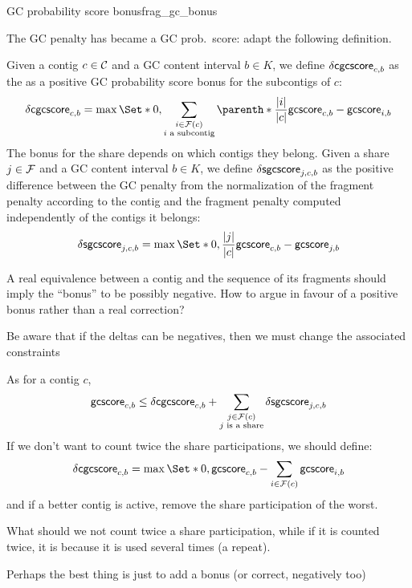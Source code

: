 \begin{definition}{GC probability score bonus}{frag_gc_bonus}
  \begin{fixmebox}
    The GC penalty has became a GC prob.\ score: adapt the following definition.
  \end{fixmebox}
  Given a contig \(c \in \mathcal{C}{}\) and a GC content interval \(b \in K\), we define \(\mathsf{\delta cgcscore}_{c, b}\) as the as a positive GC probability score bonus for the subcontigs of \(c\):
  \[
    \dcgcscore{c}{b} = \max \Set*{
      0,
      \sum_{\substack{
          i \in \Fragments{}(c) \\ i \text{ a subcontig}
      }}
      \parenth*{
        \frac{|i|}{|c|}\gcscore{c}{b} - \gcscore{i}{b}
      }
    }
  \]
  The bonus for the share depends on which contigs they belong.
  Given a share \(j \in \mathcal{F}{}\) and a GC content interval \(b \in K\), we define \(\mathsf{\delta sgcscore}_{j, c, b}\) as the positive difference between the GC penalty from the normalization of the fragment penalty according to the contig and the fragment penalty computed independently of the contigs it belongs:
  \[
    \dsgcscore{j}{c}{b} = \max \Set*{
      0,
      \frac{|j|}{|c|} \gcscore{c}{b} - \gcscore{j}{b}
    }
  \]
  \begin{questionbox}
    A real equivalence between a contig and the sequence of its fragments should imply the \enquote{bonus} to be possibly negative.
    How to argue in favour of a positive bonus rather than a real correction?

    Be aware that if the deltas can be negatives, then we must change the associated constraints
  \end{questionbox}
\end{definition}

\begin{ideabox}
  As for a contig \(c\),
  \[
    \mathsf{gcscore}_{c, b} \leq \mathsf{\delta cgcscore}_{c, b} + \sum_{\substack{
        j \in \mathcal{F}{}(c) \\
        j \text{ is a share}
    }}\mathsf{\delta sgcscore}_{j, c, b}
  \]
  If we don't want to count twice the share participations, we should define:
  \[
    \dcgcscore{c}{b} = \max \Set*{
      0,
      \gcscore{c}{b} - \sum_{i \in \Fragments{}(c)} \gcscore{i}{b}
    }
  \]
  and if a better contig is active, remove the share participation of the worst.

  \begin{questionbox}
    What should we not count twice a share participation, while if it is counted twice, it is because it is used several times (a repeat).

    Perhaps the best thing is just to add a bonus (or correct, negatively too)
  \end{questionbox}
\end{ideabox}

